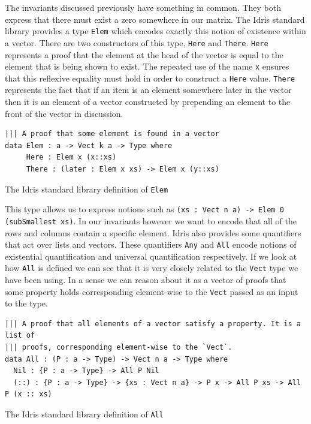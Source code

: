 \documentclass[a4paper, notitlepage]{report}
\begin{document}
The invariants discussed previously have something in common. They both express
that there must exist a zero somewhere in our matrix. The Idris standard library
provides a type \texttt{Elem} which encodes exactly this notion of existence within a
vector. There are two constructors of this type, \texttt{Here} and \texttt{There}. \texttt{Here} represents
a proof that the element at the head of the vector is equal to the element that
is being shown to exist. The repeated use of the name \texttt{x} ensures that this
reflexive equality must hold in order to construct a \texttt{Here} value. \texttt{There}
represents the fact that if an item is an element somewhere later in the vector
then it is an element of a vector constructed by prepending an element to the
front of the vector in discussion.

\begin{listing}[H]
\begin{verbatim}
||| A proof that some element is found in a vector
data Elem : a -> Vect k a -> Type where
     Here : Elem x (x::xs)
     There : (later : Elem x xs) -> Elem x (y::xs)
\end{verbatim}
\caption{The Idris standard library definition of \texttt{Elem}}
\end{listing}

This type allows us to express notions such as \texttt{(xs : Vect n a) -> Elem 0
(subSmallest xs)}. In our invariants however we want to encode that all of the
rows and columns contain a specific element. Idris also provides some
quantifiers that act over lists and vectors. These quantifiers \texttt{Any} and \texttt{All}
encode notions of existential quantification and universal quantification
respectively. If we look at how \texttt{All} is defined we can see that it is very
closely related to the \texttt{Vect} type we have been using. In a sense we can reason
about it as a vector of proofs that some property holds corresponding
element-wise to the \texttt{Vect} passed as an input to the type.

\begin{listing}[H]
\begin{verbatim}
||| A proof that all elements of a vector satisfy a property. It is a list of
||| proofs, corresponding element-wise to the `Vect`.
data All : (P : a -> Type) -> Vect n a -> Type where
  Nil : {P : a -> Type} -> All P Nil
  (::) : {P : a -> Type} -> {xs : Vect n a} -> P x -> All P xs -> All P (x :: xs)
\end{verbatim}
\caption{The Idris standard library definition of \texttt{All}}
\end{listing}
\end{document}
